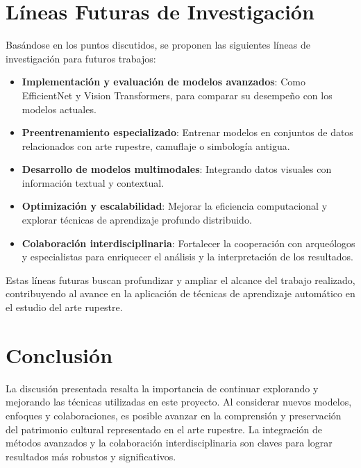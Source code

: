 \section{Líneas Futuras de Investigación}

Basándose en los puntos discutidos, se proponen las siguientes líneas de investigación para futuros trabajos:

\begin{itemize}
    \item \textbf{Implementación y evaluación de modelos avanzados}: Como EfficientNet y Vision Transformers, para comparar su desempeño con los modelos actuales.
    \item \textbf{Preentrenamiento especializado}: Entrenar modelos en conjuntos de datos relacionados con arte rupestre, camuflaje o simbología antigua.
    \item \textbf{Desarrollo de modelos multimodales}: Integrando datos visuales con información textual y contextual.
    \item \textbf{Optimización y escalabilidad}: Mejorar la eficiencia computacional y explorar técnicas de aprendizaje profundo distribuido.
    \item \textbf{Colaboración interdisciplinaria}: Fortalecer la cooperación con arqueólogos y especialistas para enriquecer el análisis y la interpretación de los resultados.
\end{itemize}

Estas líneas futuras buscan profundizar y ampliar el alcance del trabajo realizado, contribuyendo al avance en la aplicación de técnicas de aprendizaje automático en el estudio del arte rupestre.

\section{Conclusión}

La discusión presentada resalta la importancia de continuar explorando y mejorando las técnicas utilizadas en este proyecto. Al considerar nuevos modelos, enfoques y colaboraciones, es posible avanzar en la comprensión y preservación del patrimonio cultural representado en el arte rupestre. La integración de métodos avanzados y la colaboración interdisciplinaria son claves para lograr resultados más robustos y significativos.